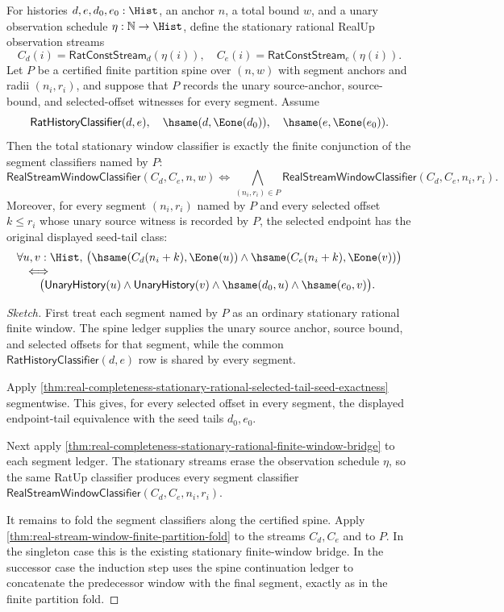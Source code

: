 \begin{theorem}
\label{thm:real-completeness-stationary-rational-partition-fold}
For histories $d,e,d_0,e_0:\Hist$, an anchor $n$, a total bound $w$, and a
unary observation schedule $\eta:\mathbb{N}\to\Hist$, define the stationary
rational RealUp observation streams
$$
C_d(i)=\mathsf{RatConstStream}_d(\eta(i)),
\quad
C_e(i)=\mathsf{RatConstStream}_e(\eta(i)).
$$
Let $P$ be a certified finite partition spine over $(n,w)$ with segment anchors
and radii $(n_i,r_i)$, and suppose that $P$ records the unary source-anchor,
source-bound, and selected-offset witnesses for every segment. Assume
$$
\mathsf{RatHistoryClassifier}(d,e),\quad
\hsame(d,\Eone(d_0)),\quad
\hsame(e,\Eone(e_0)).
$$
Then the total stationary window classifier is exactly the finite conjunction
of the segment classifiers named by $P$:
$$
\mathsf{RealStreamWindowClassifier}(C_d,C_e,n,w)
\Longleftrightarrow
\bigwedge_{(n_i,r_i)\in P}
\mathsf{RealStreamWindowClassifier}(C_d,C_e,n_i,r_i).
$$
Moreover, for every segment $(n_i,r_i)$ named by $P$ and every selected offset
$k\le r_i$ whose unary source witness is recorded by $P$, the selected endpoint
has the original displayed seed-tail class:
$$
\begin{array}{l}
\forall u,v:\Hist,\,
\bigl(\hsame(C_d(n_i+k),\Eone(u))\land
\hsame(C_e(n_i+k),\Eone(v))\bigr)\\
\quad\Longleftrightarrow\\
\qquad
\bigl(\mathsf{UnaryHistory}(u)\land
\mathsf{UnaryHistory}(v)\land
\hsame(d_0,u)\land
\hsame(e_0,v)\bigr).
\end{array}
$$
\end{theorem}

\begin{proof}[Sketch]
First treat each segment named by $P$ as an ordinary stationary rational
finite window. The spine ledger supplies the unary source anchor, source bound,
and selected offsets for that segment, while the common
$\mathsf{RatHistoryClassifier}(d,e)$ row is shared by every segment.

Apply
\autoref{thm:real-completeness-stationary-rational-selected-tail-seed-exactness}
segmentwise. This gives, for every selected offset in every segment, the
displayed endpoint-tail equivalence with the seed tails $d_0,e_0$.

Next apply
\autoref{thm:real-completeness-stationary-rational-finite-window-bridge}
to each segment ledger. The stationary streams erase the observation schedule
$\eta$, so the same RatUp classifier produces every segment classifier
$\mathsf{RealStreamWindowClassifier}(C_d,C_e,n_i,r_i)$.

It remains to fold the segment classifiers along the certified spine. Apply
\autoref{thm:real-stream-window-finite-partition-fold} to the streams
$C_d,C_e$ and to $P$. In the singleton case this is the existing stationary
finite-window bridge. In the successor case the induction step uses the spine
continuation ledger to concatenate the predecessor window with the final
segment, exactly as in the finite partition fold.
\end{proof}

